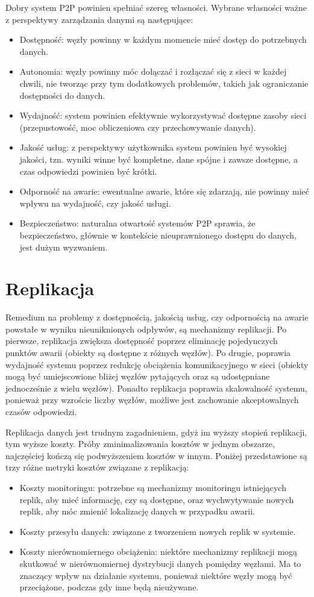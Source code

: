 \documentclass[12pt, twoside, openany]{report}
\begin{document}
Dobry system P2P powinien spełniać szereg własności. Wybrane własności ważne z perspektywy zarządzania danymi są następujące:
\begin{itemize}
\item Dostępność: węzły powinny w każdym momencie mieć dostęp do potrzebnych danych.
\item Autonomia: węzły powinny móc dołączać i rozłączać się z sieci w każdej chwili, nie tworząc przy tym dodatkowych problemów, takich jak ograniczanie dostępności do danych.
\item Wydajność: system powinien efektywnie wykorzystywać dostępne zasoby sieci (przepustowość, moc obliczeniowa czy przechowywanie danych).
\item Jakość usług: z perspektywy użytkownika system powinien być wysokiej jakości, tzn. wyniki winne być kompletne, dane spójne i zawsze dostępne, a czas odpowiedzi powinien być krótki.
\item Odporność na awarie: ewentualne awarie, które się zdarzają, nie powinny mieć wpływu na wydajność, czy jakość usługi.
\item Bezpieczeństwo: naturalna otwartość systemów P2P sprawia, że bezpieczeństwo, głównie w kontekście nieuprawnionego dostępu do danych, jest dużym wyzwaniem.
\end{itemize}

\section{Replikacja}
\label{replikacja}

Remedium na problemy z dostępnością, jakością usług, czy odpornością na awarie powstałe w wyniku nieuniknionych odpływów, są mechanizmy replikacji. Po pierwsze, replikacja zwiększa dostępność poprzez eliminację pojedynczych punktów awarii (obiekty są dostępne z różnych węzłów). Po drugie, poprawia wydajność systemu poprzez redukcję obciążenia komunikacyjnego w sieci (obiekty mogą być umiejscowione bliżej węzłów pytających oraz są udostępniane jednocześnie z wielu węzłów). Ponadto replikacja poprawia skalowalność systemu, ponieważ przy wzroście liczby węzłów, możliwe jest zachowanie akceptowalnych czasów odpowiedzi.

Replikacja danych jest trudnym zagadnieniem, gdyż im wyższy stopień replikacji, tym wyższe koszty. Próby zminimalizowania kosztów w jednym obszarze, najczęściej kończą się podwyższeniem kosztów w innym. Poniżej przedstawione są trzy różne metryki kosztów związane z replikacją:
\begin{itemize}
\item Koszty monitoringu: potrzebne są mechanizmy monitoringu istniejących replik, aby mieć informację, czy są dostępne, oraz wychwytywanie nowych replik, aby móc zmienić lokalizację danych w przypadku awarii.
\item Koszty przesyłu danych: związane z tworzeniem nowych replik w systemie.
\item Koszty nierównomiernego obciążenia: niektóre mechanizmy replikacji mogą skutkować w nierównomiernej dystrybucji danych pomiędzy węzłami. Ma to znaczący wpływ na działanie systemu, ponieważ niektóre węzły mogą być przeciążone, podczas gdy inne będą nieużywane.
\end{itemize}
\end{document}
